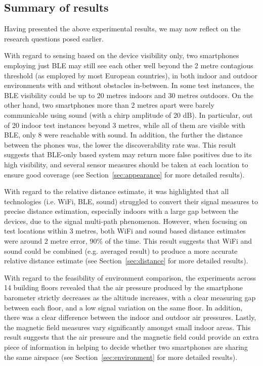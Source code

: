 \documentclass[graybox]{svmult}
\begin{document}
\subsection{Summary of results}
Having presented the above experimental results, we may now reflect on the research questions posed earlier.

With regard to sensing based on the device visibility only, two smartphones employing just BLE may still see each other well beyond the 2 metre contagious threshold (as employed by most European countries), in both indoor and outdoor environments with and without obstacles in-between. In some test instances, the BLE visibility could be up to 20 metres indoors and 30 metres outdoors. On the other hand, two smartphones more than 2 metres apart were barely communicable using sound (with a chirp amplitude of 20 dB). In particular, out of 20 indoor test instances beyond 3 metres, while all of them are visible with BLE, only 8 were reachable with sound. In addition, the further the distance between the phones was, the lower the discoverability rate was. This result suggests that BLE-only based system may return more false positives due to its high visibility, and several sensor measures should be taken at each location to ensure good coverage (see Section~\ref{sec:appearance} for more detailed results).

With regard to the relative distance estimate, it was highlighted that all technologies (i.e. WiFi, BLE, sound) struggled to convert their signal measures to precise distance estimation, especially indoors with a large gap between the devices, due to the signal multi-path phenomenon. However, when focusing on test locations within 3 metres, both WiFi and sound based distance estimates were around 2 metre error, 90\% of the time. This result suggests that WiFi and sound could be combined (e.g. averaged result) to produce a more accurate relative distance estimate (see Section~\ref{sec:distance} for more detailed results).

With regard to the feasibility of environment comparison, the experiments across 14 building floors revealed that the air pressure produced by the smartphone barometer strictly decreases as the altitude increases, with a clear measuring gap between each floor, and a low signal variation on the same floor. In addition, there was a clear difference between the indoor and outdoor air pressures. Lastly, the magnetic field measures vary significantly amongst small indoor areas. This result suggests that the air pressure and the magnetic field could provide an extra piece of information in helping to decide whether two smartphones are sharing the same airspace (see Section~\ref{sec:environment} for more detailed results).
\end{document}
